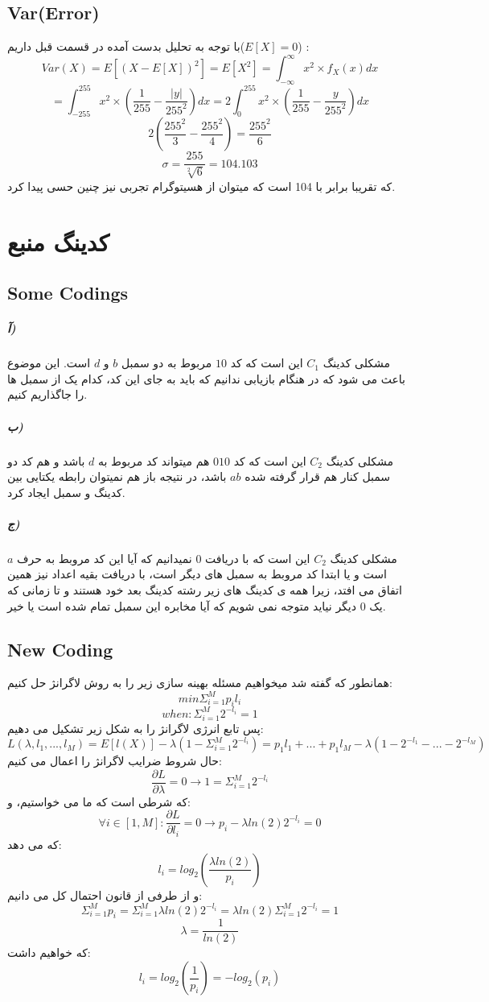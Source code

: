 \documentclass[a4paper,12pt]{article}
\begin{document}
\subsection{Var(Error)}
با توجه به تحلیل بدست آمده در قسمت قبل داریم($E[X] = 0 $) :
$$
Var(X) = E[(X - E[X])^2] = E[X^2] = \int_{-\infty}^{\infty} x^2 \times f_X(x) dx 
$$
$$
= \int_{-255}^{255} x^2 \times (\frac{1}{255} - \frac{|y|}{255^2}) dx = 2\int_{0}^{255} x^2 \times (\frac{1}{255} - \frac{y}{255^2}) dx
$$
$$
2(\frac{255^2}{3} - \frac{255^2}{4}) = \frac{255^2}{6}
$$
$$
\sigma = \frac{255}{\sqrt[2]{6}} = 104.103
$$
که تقریبا برابر با 104 است که میتوان از هسیتوگرام تجربی نیز چنین حسی پیدا کرد.
\clearpage
\section{کدینگ منبع}
\subsection{Some Codings}
\subparagraph{آ)}
مشکلی کدینگ $C_1 $ این است که کد $10$ مربوط به دو سمبل $b$ و $d$ است. این موضوع باعث می شود که در هنگام بازیابی ندانیم که باید به جای این کد، کدام یک از سمبل ها را جاگذاریم کنیم.
\\
\subparagraph{ب)}
مشکلی کدینگ $C_2 $ این است که کد $010$ هم میتواند کد مربوط به $d$ باشد و هم کد دو سمبل کنار هم قرار گرفته شده $ab$ باشد، در نتیجه باز هم نمیتوان رابطه یکتایی بین کدینگ و سمبل ایجاد کرد.
\\
\subparagraph{ج)}
مشکلی کدینگ $C_2 $ این است که با دریافت $0$ نمیدانیم که آیا این کد مروبط به حرف $a$ است و یا ابتدا کد مروبط به سمبل های دیگر است، با دریافت بقیه اعداد نیز همین اتفاق می افتد، زیرا همه ی کدینگ های زیر رشته کدینگ بعد خود هستند و تا زمانی که یک $0$ دیگر نیاید متوجه نمی شویم که آیا مخابره این سمبل تمام شده است یا خیر.
\subsection{New Coding}
همانطور که گفته شد میخواهیم مسئله بهینه سازی زیر را به روش لاگرانژ حل کنیم:
$$
min \Sigma^M_{i=1} p_il_i
$$
$$
when:\Sigma^M_{i=1} 2^{-l_i} = 1
$$
پس تابع انرژی لاگرانژ را به شکل زیر تشکیل می دهیم:
$$
L(\lambda, l_1, ..., l_M) = E[l(X)] - \lambda(1 - \Sigma^M_{i=1} 2^{-l_i}) = p_1l_1 + ... + p_1l_M  - \lambda(1 - 2^{-l_1} -...- 2^{-l_M})
$$
حال شروط ضرایب لاگرانژ را اعمال می کنیم:
$$
\frac{\partial L}{\partial \lambda} = 0 \rightarrow 1 = \Sigma^M_{i=1} 2^{-l_i}
$$
که شرطی است که ما می خواستیم، و:
$$
\forall i \in [1,M] : \frac{\partial L}{\partial l_i} = 0 \rightarrow p_i - \lambda ln(2) 2^{-l_i} = 0
$$
که می دهد:
$$
l_i = log_2(\frac{\lambda ln(2)}{p_i})
$$
و از طرفی از قانون احتمال کل می دانیم:
$$
\Sigma^M_{i=1} p_i = \Sigma^M_{i=1} \lambda ln(2) 2^{-l_i} = \lambda ln(2) \Sigma^M_{i=1} 2^{-l_i} = 1 
$$
$$
\lambda = \frac{1}{ln(2)}
$$
که خواهیم داشت:
$$
l_i = log_2(\frac{1}{p_i}) = -log_2(p_i)
$$
\\
\end{document}
